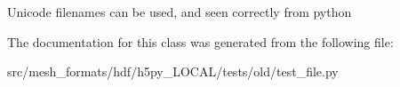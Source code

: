 \begin{DoxyVerb}Unicode filenames can be used, and seen correctly from python
\end{DoxyVerb}
 

The documentation for this class was generated from the following file\+:\begin{DoxyCompactItemize}
\item 
src/mesh\+\_\+formats/hdf/h5py\+\_\+\+L\+O\+C\+A\+L/tests/old/test\+\_\+file.\+py\end{DoxyCompactItemize}
